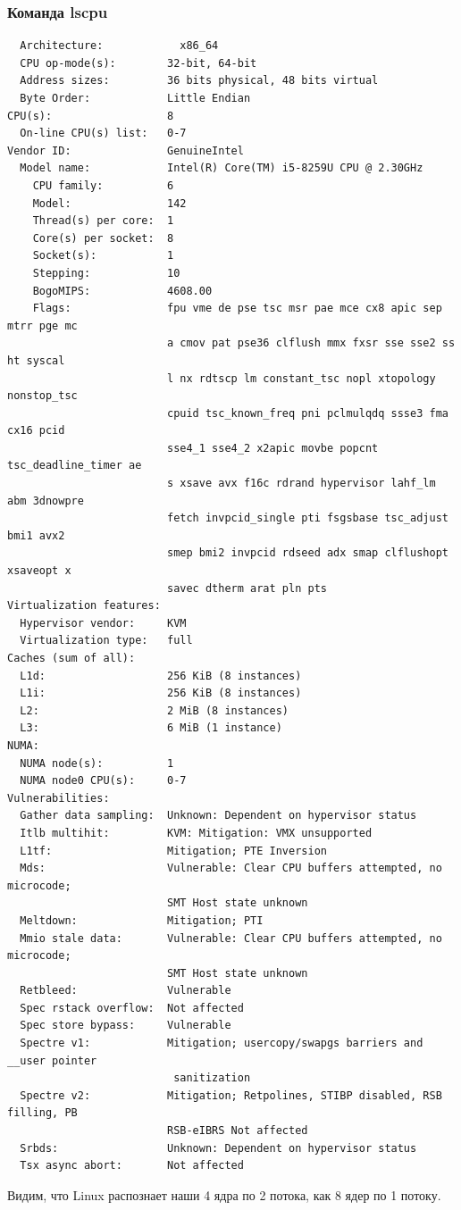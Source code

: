 \documentclass[12pt,onecolumn]{article}
\begin{document}
\subsubsection{Команда lscpu}
\begin{verbatim}
  Architecture:            x86_64
  CPU op-mode(s):        32-bit, 64-bit
  Address sizes:         36 bits physical, 48 bits virtual
  Byte Order:            Little Endian
CPU(s):                  8
  On-line CPU(s) list:   0-7
Vendor ID:               GenuineIntel
  Model name:            Intel(R) Core(TM) i5-8259U CPU @ 2.30GHz
    CPU family:          6
    Model:               142
    Thread(s) per core:  1
    Core(s) per socket:  8
    Socket(s):           1
    Stepping:            10
    BogoMIPS:            4608.00
    Flags:               fpu vme de pse tsc msr pae mce cx8 apic sep mtrr pge mc
                         a cmov pat pse36 clflush mmx fxsr sse sse2 ss ht syscal
                         l nx rdtscp lm constant_tsc nopl xtopology nonstop_tsc 
                         cpuid tsc_known_freq pni pclmulqdq ssse3 fma cx16 pcid 
                         sse4_1 sse4_2 x2apic movbe popcnt tsc_deadline_timer ae
                         s xsave avx f16c rdrand hypervisor lahf_lm abm 3dnowpre
                         fetch invpcid_single pti fsgsbase tsc_adjust bmi1 avx2 
                         smep bmi2 invpcid rdseed adx smap clflushopt xsaveopt x
                         savec dtherm arat pln pts
Virtualization features: 
  Hypervisor vendor:     KVM
  Virtualization type:   full
Caches (sum of all):     
  L1d:                   256 KiB (8 instances)
  L1i:                   256 KiB (8 instances)
  L2:                    2 MiB (8 instances)
  L3:                    6 MiB (1 instance)
NUMA:                    
  NUMA node(s):          1
  NUMA node0 CPU(s):     0-7
Vulnerabilities:         
  Gather data sampling:  Unknown: Dependent on hypervisor status
  Itlb multihit:         KVM: Mitigation: VMX unsupported
  L1tf:                  Mitigation; PTE Inversion
  Mds:                   Vulnerable: Clear CPU buffers attempted, no microcode; 
                         SMT Host state unknown
  Meltdown:              Mitigation; PTI
  Mmio stale data:       Vulnerable: Clear CPU buffers attempted, no microcode; 
                         SMT Host state unknown
  Retbleed:              Vulnerable
  Spec rstack overflow:  Not affected
  Spec store bypass:     Vulnerable
  Spectre v1:            Mitigation; usercopy/swapgs barriers and __user pointer
                          sanitization
  Spectre v2:            Mitigation; Retpolines, STIBP disabled, RSB filling, PB
                         RSB-eIBRS Not affected
  Srbds:                 Unknown: Dependent on hypervisor status
  Tsx async abort:       Not affected

\end{verbatim}
Видим, что Linux распознает наши 4 ядра по 2 потока, как 8 ядер по 1 потоку.
\end{document}
